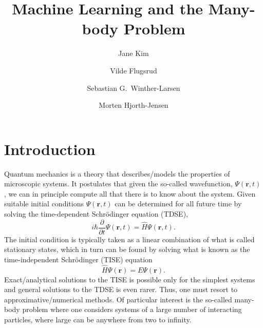 \documentclass[aip,jcp,reprint,floatfix]{revtex4-1}
\begin{document}
\title{Machine Learning and the Many-body Problem}

\author{Jane Kim}

\author{Vilde Flugsrud}

\author{Sebastian G.~Winther-Larsen}


\author{Morten Hjorth-Jensen}



\begin{abstract}

\end{abstract}


\maketitle




\section{Introduction}

Quantum mechanics is a theory that describes/models the properties of
microscopic systems. It postulates that given the so-called
wavefunction, $\Psi(\mathbf{r},t)$, we can in principle compute all
that there is to know about the system.  Given suitable initial
conditions $\Psi(\mathbf{r},t)$ can be determined for all future time
by solving the time-dependent Schrödinger equation (TDSE),
\begin{equation}
 i \hbar \frac{\partial }{\partial t} \Psi(\mathbf{r},t) = \hat{H} \Psi(\mathbf{r},t).
\end{equation}
The initial condition is typically taken as a linear combination of what is called stationary states, which in turn can be found by solving what is known as the 
time-independent Schrödinger (TISE) equation
\begin{equation}
 \hat{H} \Psi(\mathbf{r}) = E \Psi(\mathbf{r}).
\end{equation}
Exact/analytical solutions to the TISE is possible only for the
simplest systems and general solutions to the TDSE is even
rarer. Thus, one must resort to approximative/numerical methods. Of
particular interest is the so-called many-body problem where one
considers systems of a large number of interacting particles, where
large can be anywhere from two to infinity.
\end{document}
